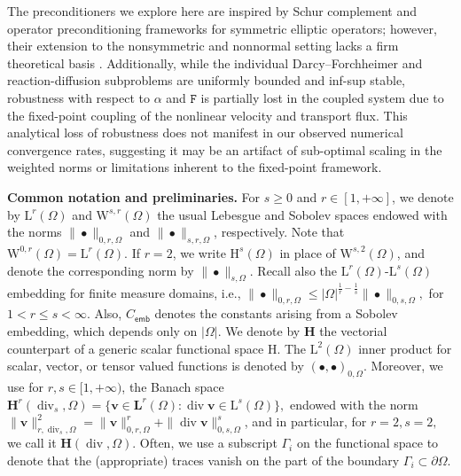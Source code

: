 \documentclass[11pt, reqno, a4paper, twoside]{article}
\newcommand{\bv}{\boldsymbol{v}}
\newcommand{\rF}{\mathtt{F}}
\newcommand{\rH}{\mathrm{H}}
\newcommand{\rL}{\mathrm{L}}
\newcommand{\rW}{\mathrm{W}}
\newcommand{\bH}{\mathbf{H}}
\newcommand{\bL}{\mathbf{L}}
\newcommand\vdiv{\mathop{\mathrm{div}}\nolimits}
\numberwithin{equation}{section}
\numberwithin{remark}{section}
\numberwithin{figure}{section}
\numberwithin{table}{section}
\begin{document}
{The preconditioners  we explore here are  inspired by Schur complement and operator preconditioning frameworks for symmetric elliptic operators; however, their extension to the nonsymmetric and nonnormal setting lacks a firm theoretical basis  \cite{wathen2015preconditioning,ernst2000residual}. Additionally, while the individual Darcy--Forchheimer and reaction-diffusion subproblems are uniformly bounded and inf-sup stable, robustness with respect to $\alpha$ and $\rF$ is partially lost in the coupled system due to the fixed-point coupling of the nonlinear velocity and transport flux. This analytical loss of robustness does not manifest in our observed numerical convergence rates, suggesting it may be an artifact of sub-optimal scaling in the weighted norms or limitations inherent to the fixed-point framework.}


 
\smallskip
\noindent\textbf{Common notation and preliminaries.} For $s\geq 0$ and $r\in[1,+\infty]$, we denote by $\rL^r(\Omega)$ and $\rW^{s,r}(\Omega)$ the usual Lebesgue and Sobolev spaces endowed with the norms $\|\bullet\|_{0,r,\Omega}$ and $\|\bullet\|_{s,r,\Omega}$, respectively.
Note that $\rW^{0,r}(\Omega)=\rL^r(\Omega)$. 
If $r = 2$, we write $\rH^{s}(\Omega)$ in place of $\rW^{s,2}(\Omega)$, and denote the corresponding norm by $\|\bullet\|_{s,\Omega}$. {Recall also the \(\rL^r(\Omega)\)-\(\rL^s(\Omega)\) embedding for finite measure domains, i.e.,   \(\|\bullet\|_{0,r,\Omega}\leq|\Omega|^{\frac1r-\frac1s}\|\bullet\|_{0,s,\Omega},\) for \(1<r\leq s<\infty.\)} Also, $C_{\mathsf{emb}}$ denotes the constants arising from a Sobolev embedding, which depends only on $|\Omega|.$ We 
denote by $\mathbf{H}$ the vectorial counterpart of a generic scalar functional space $\rH$. The $\rL^2(\Omega)$ inner product for scalar, vector, or tensor valued functions
is denoted by $(\bullet,\bullet)_{0,\Omega}$. 
Moreover, we  use for $r,s \in [1,+\infty)$, the Banach space 
$\bH^r(\vdiv_s,\Omega)=\{ \bv \in \bL^r(\Omega): \vdiv \bv \in \rL^s(\Omega)\},$ endowed with the norm $\|\bv\|_{r,\vdiv_s,\Omega}^2 = \|\bv\|^r_{0,r,\Omega} + \|\vdiv \bv\|^s_{0,s,\Omega}$, {and in particular, for $r=2, s=2,$ we call it $\bH(\vdiv,\Omega)$.}
Often, we  use a subscript $\Gamma_i$ on the functional space to denote that the (appropriate) traces vanish on the part of the boundary $\Gamma_i\subset \partial \Omega$. 
\end{document}
